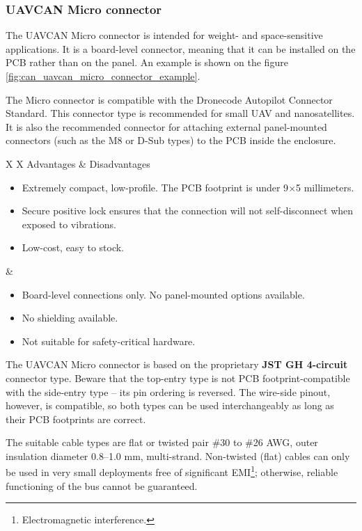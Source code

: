 \clearpage  %
\subsubsection{UAVCAN Micro connector}

The UAVCAN Micro connector is intended for weight- and space-sensitive applications.
It is a board-level connector, meaning that it can be installed on the PCB rather than on the panel.
An example is shown on the figure \ref{fig:can_uavcan_micro_connector_example}.

The Micro connector is compatible with the Dronecode Autopilot Connector Standard.
This connector type is recommended for small UAV and nanosatellites.
It is also the recommended connector for attaching external panel-mounted connectors
(such as the M8 or D-Sub types) to the PCB inside the enclosure.

{
\NoLeftSkip
\begin{UAVCANCompactTable}{X X}
    Advantages & Disadvantages \\
    \begin{itemize}
        \item Extremely compact, low-profile. The PCB footprint is under 9$\times$5 millimeters.
        \item Secure positive lock ensures that the connection will not self-disconnect when exposed to vibrations.
        \item Low-cost, easy to stock.
    \end{itemize}
    &
    \begin{itemize}
        \item Board-level connections only. No panel-mounted options available.
        \item No shielding available.
        \item Not suitable for safety-critical hardware.
    \end{itemize}
\end{UAVCANCompactTable}
}

The UAVCAN Micro connector is based on the proprietary \textbf{JST GH 4-circuit} connector type.
Beware that the top-entry type is not PCB footprint-compatible with the side-entry type --
its pin ordering is reversed.
The wire-side pinout, however, is compatible, so both types can be used interchangeably as long
as their PCB footprints are correct.

The suitable cable types are flat or twisted pair \#30 to \#26 AWG,
outer insulation diameter 0.8--1.0 mm, multi-strand.
Non-twisted (flat) cables can only be used in very small deployments free of significant
EMI\footnote{Electromagnetic interference.};
otherwise, reliable functioning of the bus cannot be guaranteed.


